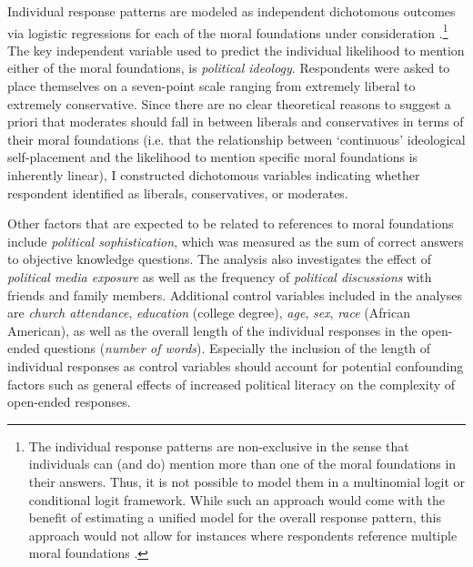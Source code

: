 \documentclass[12pt]{article}
\begin{document}
Individual response patterns are modeled as independent dichotomous outcomes via logistic regressions for each of the moral foundations under consideration \citep[c.f. for example][]{agresti1999modeling}.\footnote{The individual response patterns are non-exclusive in the sense that individuals can (and do) mention more than one of the moral foundations in their answers. Thus, it is not possible to model them in a multinomial logit or conditional logit framework. While such an approach would come with the benefit of estimating a unified model for the overall response pattern, this approach would not allow for instances where respondents reference multiple moral foundations \citep[but see][]{gilbert2007models}.} The key independent variable used to predict the individual likelihood to mention either of the moral foundations, is \textit{political ideology}. Respondents were asked to place themselves on a seven-point scale ranging from extremely liberal to extremely conservative. Since there are no clear theoretical reasons to suggest a priori that moderates should fall in between liberals and conservatives in terms of their moral foundations (i.e. that the relationship between `continuous' ideological self-placement and the likelihood to mention specific moral foundations is inherently linear), I constructed dichotomous variables indicating whether respondent identified as liberals, conservatives, or moderates.

Other factors that are expected to be related to references to moral foundations include \textit{political sophistication}, which was measured as the sum of correct answers to objective knowledge questions. The analysis also investigates the effect of \textit{political media exposure} as well as the frequency of \textit{political discussions} with friends and family members. Additional control variables included in the analyses are \textit{church attendance}, \textit{education} (college degree), \textit{age}, \textit{sex}, \textit{race} (African American), as well as the overall length of the individual responses in the open-ended questions (\textit{number of words}). Especially the inclusion of the length of individual responses as control variables should account for potential confounding factors such as general effects of increased political literacy on the complexity of open-ended responses.
\end{document}
